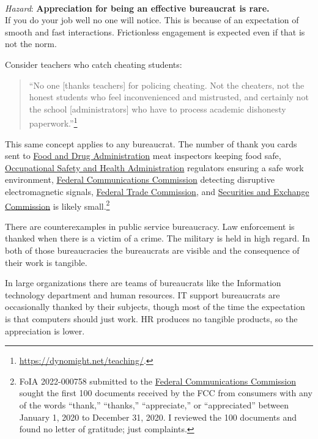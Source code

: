 \ \\
\begin{samepage}
\textit{Hazard}: \textbf{Appreciation for being an effective bureaucrat is rare.}\\
If you do your job well no one will notice. This is because of an expectation of smooth and fast interactions. Frictionless engagement is expected even if that is not the norm. 

Consider teachers who catch cheating students:
\begin{quote}
``No one [thanks teachers] for policing cheating. Not the cheaters, not the honest students who feel inconvenienced and mistrusted, and certainly not the school [administrators] who have to process academic dishonesty paperwork.''\footnote{\href{https://dynomight.net/teaching/}{https://dynomight.net/teaching/}.}
\end{quote}
\end{samepage}

This same concept applies to any bureaucrat. The number of thank you cards sent to \href{https://www.fda.gov/}{Food and Drug Administration} meat inspectors keeping food safe, \href{https://www.osha.gov/}{Occupational Safety and Health Administration} regulators ensuring a safe work environment, \href{https://www.fcc.gov/}{Federal Communications Commission} detecting disruptive electromagnetic signals, \href{https://www.ftc.gov/}{Federal Trade Commission}, and \href{https://www.sec.gov/}{Securities and Exchange Commission} is likely small.\footnote{FoIA 2022-000758 submitted to the \href{https://www.fcc.gov/}{Federal Communications Commission}  
sought the first 100 documents received by the FCC from consumers with any of the words ``thank,'' ``thanks,'' ``appreciate,'' or ``appreciated'' between January 1, 2020 to December 31, 2020. 
I reviewed the 100 documents and found no letter of gratitude; just complaints.}

There are counterexamples in public service bureaucracy. 
Law enforcement is thanked when there is a victim of a crime. 
The military is held in high regard. 
In both of those bureaucracies the bureaucrats are visible and the consequence of their work is tangible. 

In large organizations there are teams of bureaucrats like the Information technology department and human resources. IT support bureaucrats are occasionally thanked by their subjects, though most of the time the expectation is that computers should just work. HR produces no tangible products, so the appreciation is lower.


